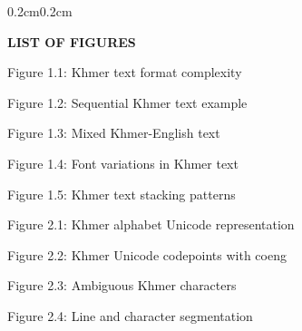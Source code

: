 \begin{adjustwidth}{0.2cm}{0.2cm}

    \begin{center}
        {\englishfont\fontsize{14pt}{21pt}\selectfont \textbf{LIST OF FIGURES} \par}
    \end{center}
    \label{lof}

    \vspace{0.1cm}
    \setlength{\parindent}{0pt}
    \vspace{0.3cm}
    
    {\large Figure 1.1: Khmer text format complexity\dotfill\pageref{fig:text_format}\hspace{0.1cm}\par}
    
    {\large Figure 1.2: Sequential Khmer text example\dotfill\pageref{fig:sequential_text}\hspace{0.1cm}\par}
    
    {\large Figure 1.3: Mixed Khmer-English text\dotfill\pageref{fig:mix_language}\hspace{0.1cm}\par}
    
    {\large Figure 1.4: Font variations in Khmer text\dotfill\pageref{fig:font_variants}\hspace{0.1cm}\par}
    
    {\large Figure 1.5: Khmer text stacking patterns\dotfill\pageref{fig:text_stacking}\hspace{0.1cm}\par}
    
    {\large Figure 2.1: Khmer alphabet Unicode representation\dotfill\pageref{fig:khmer_alphabets}\hspace{0.1cm}\par}
    
    {\large Figure 2.2: Khmer Unicode codepoints with coeng\dotfill\pageref{fig:khmer_codepoints}\hspace{0.1cm}\par}
    
    {\large Figure 2.3: Ambiguous Khmer characters\dotfill\pageref{fig:Ambiguous_characters}\hspace{0.1cm}\par}
    
    {\large Figure 2.4: Line and character segmentation\dotfill\pageref{fig:khmer_character_segmentation}\hspace{0.1cm}\par}
    

\end{adjustwidth}
